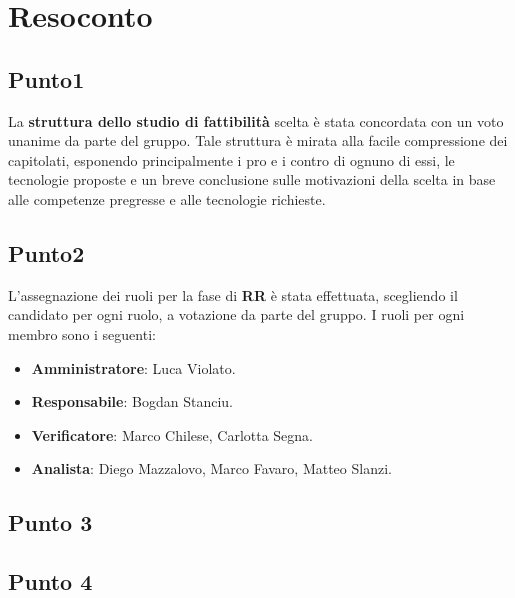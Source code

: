 \section{Resoconto}

\subsection{Punto1}

La \textbf{struttura dello studio di fattibilità} scelta è stata concordata con un voto unanime da parte del gruppo. Tale struttura è mirata alla facile compressione dei capitolati, esponendo principalmente i pro e i contro di ognuno di essi, le tecnologie proposte e un breve conclusione sulle motivazioni della scelta in base alle competenze pregresse e alle tecnologie richieste.  


\subsection{Punto2}
L'assegnazione dei ruoli per la fase di \textbf{RR} è stata effettuata, scegliendo il candidato per ogni ruolo, a votazione da parte del gruppo. I ruoli per ogni membro sono i seguenti: 
\begin{itemize}
	\item \textbf{Amministratore}: Luca Violato.
	\item \textbf{Responsabile}: Bogdan Stanciu.
	\item \textbf{Verificatore}: Marco Chilese, Carlotta Segna. 
	\item \textbf{Analista}: Diego Mazzalovo, Marco Favaro, Matteo Slanzi. 
\end{itemize}


\subsection{Punto 3}

\subsection{Punto 4}


